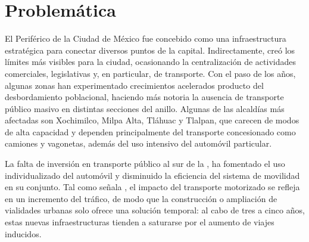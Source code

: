 \section{Problemática}
\label{sec:problematica}

El Periférico de la Ciudad de México fue concebido como una infraestructura
estratégica para conectar diversos puntos de la capital. Indirectamente, creó
los límites más visibles para la ciudad, ocasionando la centralización de
actividades comerciales, legislativas y, en particular, de transporte. Con el
paso de los años, algunas zonas han experimentado crecimientos acelerados
producto del desbordamiento poblacional, haciendo más notoria la ausencia de
transporte público masivo en distintas secciones del anillo. Algunas de las 
alcaldías más
afectadas son Xochimilco, Milpa Alta, Tláhuac y Tlalpan, que carecen de modos
 de alta capacidad y dependen principalmente del transporte
concesionado como camiones y vagonetas, además del uso intensivo del automóvil
particular.

La falta  de inversión en
transporte público al sur 
de la \cdmx{}, ha fomentado el uso individualizado del automóvil y
disminuido la eficiencia del sistema de movilidad en su conjunto. Tal como
señala \cite{cano2002}, el impacto del
transporte motorizado se refleja en un incremento del tráfico, de modo que la
construcción o ampliación de vialidades urbanas solo ofrece una solución
temporal: al cabo de tres a cinco años, estas nuevas infraestructuras tienden a
saturarse por el aumento de viajes inducidos.

